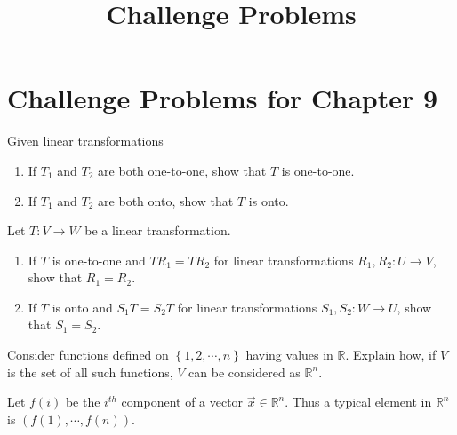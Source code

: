 \documentclass{ximera}
\title{Challenge Problems} \license{CC BY-NC-SA 4.0}
\begin{document}
\begin{abstract}
\end{abstract}
\maketitle

\section*{Challenge Problems for Chapter 9}

\begin{problem}\label{prob:nich7.3.10}
    Given linear transformations 
    \begin{center}
\end{center}
\begin{enumerate}
    \item If $T_1$ and $T_2$ are both one-to-one, show that $T$ is one-to-one.
    \item If $T_1$ and $T_2$ are both onto, show that $T$ is onto.
\end{enumerate}
\end{problem}

\begin{problem}\label{prob:7.3.11}
Let $T:V\rightarrow W$ be a linear transformation.
\begin{enumerate}
    \item If $T$ is one-to-one and $TR_1=TR_2$ for linear transformations $R_1,R_2:U\rightarrow V$, show that $R_1=R_2$.
    \item If $T$ is onto and $S_1T=S_2T$ for linear transformations $S_1,S_2:W\rightarrow U$, show that $S_1=S_2$.
\end{enumerate}
    \end{problem}

\begin{problem}\label{prb:10.21} Consider functions defined on $\left\{ 1,2,\cdots ,n\right\} $ having
values in $\mathbb{R}$. Explain how, if $V$ is the set of all such
functions, $V$ can be considered as $\mathbb{R}^{n}$.
\begin{hint}
Let $f\left( i\right) $ be the $i^{th}$ component of a vector $
\vec{x}\in \mathbb{R}^{n}$. Thus a typical element in $\mathbb{R}^{n}$ is $
\left( f\left( 1\right) ,\cdots ,f\left( n\right) \right) $.
\end{hint}
\end{problem}
\end{document}
